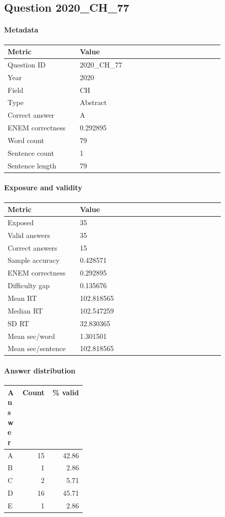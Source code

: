 \subsection*{Question 2020\_CH\_77}
\label{sec:q_2020_CH_77}
\paragraph{Metadata}
\begin{tabular}{p{0.30\linewidth}p{0.60\linewidth}}
\toprule
Metric & Value\\
\midrule
Question ID & 2020\_CH\_77\\
Year & 2020\\
Field & CH\\
Type & Abstract\\
Correct answer & A\\
ENEM correctness & 0.292895\\
Word count & 79\\
Sentence count & 1\\
Sentence length & 79\\
\bottomrule
\end{tabular}

\paragraph{Exposure and validity}
\begin{tabular}{p{0.30\linewidth}p{0.60\linewidth}}
\toprule
Metric & Value\\
\midrule
Exposed & 35\\
Valid answers & 35\\
Correct answers & 15\\
Sample accuracy & 0.428571\\
ENEM correctness & 0.292895\\
Difficulty gap & 0.135676\\
Mean RT & 102.818565\\
Median RT & 102.547259\\
SD RT & 32.830365\\
Mean sec/word & 1.301501\\
Mean sec/sentence & 102.818565\\
\bottomrule
\end{tabular}

\paragraph{Answer distribution}
\begin{tabular}{p{0.18\linewidth}rr}
\toprule
Answer & Count & \% valid\\
\midrule
A & 15 & 42.86\\
B & 1 & 2.86\\
C & 2 & 5.71\\
D & 16 & 45.71\\
E & 1 & 2.86\\
\bottomrule
\end{tabular}

